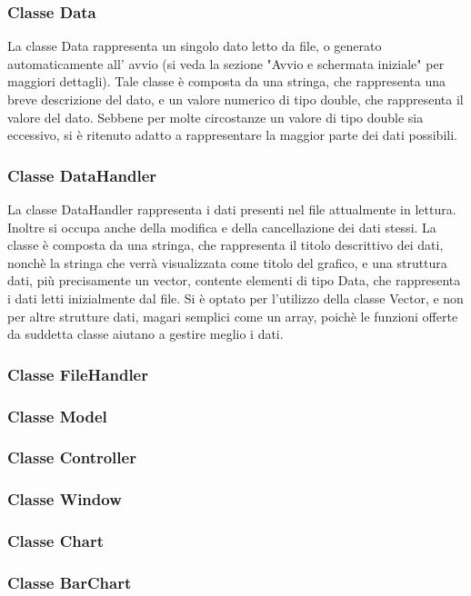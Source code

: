 \documentclass[10pt]{article}
\begin{document}
    \subsubsection{Classe Data}
    La classe Data rappresenta un singolo dato letto da file, o generato automaticamente all' avvio (si veda la sezione "Avvio e schermata iniziale" per maggiori dettagli).
    Tale classe è composta da una stringa, che rappresenta una breve descrizione del dato, e un valore numerico di tipo double, che rappresenta il valore del dato. Sebbene per molte circostanze un valore di tipo double sia eccessivo, si è ritenuto adatto a rappresentare la maggior parte dei dati possibili.
    \subsubsection{Classe DataHandler}
    La classe DataHandler rappresenta i dati presenti nel file attualmente in lettura. Inoltre si occupa anche della modifica e della cancellazione dei dati stessi.
    La classe è composta da una stringa, che rappresenta il titolo descrittivo dei dati, nonchè la stringa che verrà visualizzata come titolo del grafico, e una struttura dati, più precisamente un vector, contente elementi di tipo Data, che rappresenta i dati letti inizialmente dal file.
    Si è optato per l'utilizzo della classe Vector, e non per altre strutture dati, magari semplici come un array, poichè le funzioni offerte da suddetta classe aiutano a gestire meglio i dati.
    \subsubsection{Classe FileHandler}
    \subsubsection{Classe Model}
    \subsubsection{Classe Controller}
    \subsubsection{Classe Window}
    \subsubsection{Classe Chart}
    \subsubsection{Classe BarChart}
\end{document}
